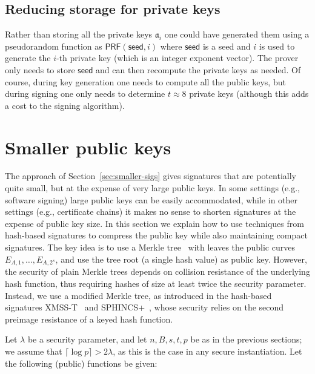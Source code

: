 \documentclass{llncs}
\newcommand{\seed}{\textsf{seed}}
\renewcommand{\a}{\mathfrak{a}}
\newcommand{\PRF}{\textsf{PRF}}
\begin{document}
\subsection{Reducing storage for private keys}\label{sec:private-key-compress}

Rather than storing all the private keys $\a_i$ one could have generated them using a pseudorandom function as $\PRF( \seed, i )$ where $\seed$ is a seed and $i$ is used to generate the $i$-th private key (which is an integer exponent vector).
The prover only needs to store $\seed$ and can then recompute the private keys as needed.
Of course, during key generation one needs to compute all the public keys, but during signing one only needs to determine $t \approx 8$ private keys (although this adds a cost to the signing algorithm).





\section{Smaller public keys} \label{sec:smaller-keys}

The approach of Section~\ref{sec:smaller-sigs} gives signatures that are potentially quite small, but at the expense of very large public keys. In some settings (e.g., software signing) large public keys can be easily accommodated, while in other settings (e.g., certificate chains) it makes no sense to shorten signatures at the expense of public key size.
In this section we explain how to use techniques from hash-based signatures to compress the public key while also maintaining compact signatures.
The key idea is to use a Merkle tree~\cite{10.1007/0-387-34805-0_21} with leaves the public curves $E_{A,1}, \dots, E_{A,2^s}$, and use the tree root (a single hash value) as public key.
However, the security of plain Merkle trees depends on collision resistance of the underlying hash function, thus requiring hashes of size at least twice the security parameter.
Instead, we use a modified Merkle tree, as introduced in the hash-based signatures XMSS-T~\cite{10.1007/978-3-662-49384-7_15} and SPHINCS+~\cite{sphincs+}, whose security relies on the second preimage resistance of a keyed hash function.

Let $\lambda$ be a security parameter, and let $n,B,s,t,p$ be as in the previous sections; we assume that $\lceil\log p\rceil > 2\lambda$, as this is the case in any secure instantiation.
Let the following (public) functions be given:
\end{document}

